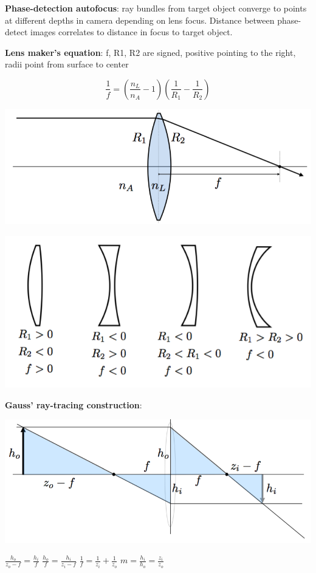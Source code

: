 \documentclass[9pt,landscape]{extarticle}
\begin{document}
\begin{multicols}{3}
\textbf{Phase-detection autofocus}: ray bundles from target object converge to points at different depths in camera depending on lens focus. Distance between phase-detect images correlates to distance in focus to target object.

\textbf{Lens maker's equation}: f, R1, R2 are signed, positive pointing to the right, radii point from surface to center

$$
\displaystyle\frac{1}{f} = \left(\frac{n_L}{n_A}-1\right)\left(\frac{1}{R_1}-\frac{1}{R_2}\right)
$$

\includegraphics[scale=0.16]{lensmaker}

\includegraphics[scale=0.20]{lensmaker_radii}

\textbf{Gauss' ray-tracing construction}:

\includegraphics[scale=0.20]{gauss_ray}

\begin{multicols}{4}
$\frac{h_o}{z_o - f} = \frac{h_i}{f}$
\columnbreak
$\frac{h_o}{f} = \frac{h_i}{z_i-f}$
\columnbreak
$\frac{1}{f} = \frac{1}{z_i} + \frac{1}{z_o}$
\columnbreak
$m = \frac{h_i}{h_o} = \frac{z_i}{z_o}$
\end{multicols}


\end{multicols}
\end{document}
